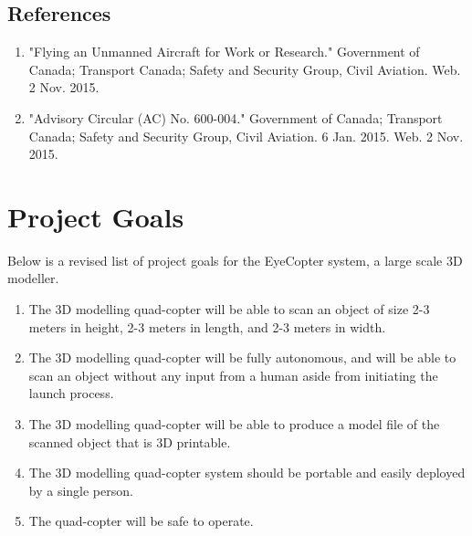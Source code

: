 \documentclass[10pt,letterpaper]{article}
\begin{document}
\newpage


\subsection{References}
\begin{enumerate}
	\item "Flying an Unmanned Aircraft for Work or Research." Government of Canada; Transport Canada; Safety and Security Group, Civil Aviation. Web. 2 Nov. 2015.
	\item "Advisory Circular (AC) No. 600-004." Government of Canada; Transport Canada; Safety and Security Group, Civil Aviation. 6 Jan. 2015. Web. 2 Nov. 2015.
\end{enumerate}


\newpage


\section{Project Goals}
Below is a revised list of project goals for the EyeCopter system, a large scale 3D modeller. 
\begin{enumerate}
	\item The 3D modelling quad-copter will be able to scan an object of size 2-3 meters in height, 2-3 meters in length, and 2-3 meters in width. 
	\item The 3D modelling quad-copter will be fully autonomous, and will be able to scan an object without any input from a human aside from initiating the launch process.  
	\item The 3D modelling quad-copter will be able to produce a model file of the scanned object that is 3D printable.
	\item The 3D modelling quad-copter system should be portable and easily deployed by a single person.
    \item The quad-copter will be safe to operate.
\end{enumerate}
\end{document}
